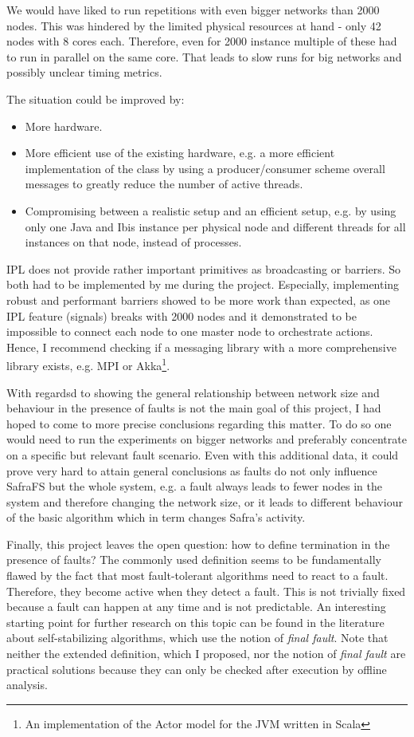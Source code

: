We would have liked to run repetitions with even bigger networks than 2000 nodes.
This was hindered by the limited physical resources at hand - only 42 nodes with 8 cores each.
Therefore, even for 2000 instance multiple of these had to run in parallel on the same core.
That leads to slow runs for big networks and possibly unclear timing metrics.

The situation could be improved by:
\begin{itemize}
    \item More hardware.
    \item More efficient use of the existing hardware, e.g. a more efficient implementation of the  class by using a producer/consumer scheme overall messages to greatly reduce the number of active threads.
    \item Compromising between a realistic setup and an efficient setup, e.g. by using only one Java and Ibis instance per physical node and different threads for all instances on that node, instead of processes.
\end{itemize}


IPL does not provide rather important primitives as broadcasting or barriers.
So both had to be implemented by me during the project.
Especially, implementing robust and performant barriers showed to be more work than expected, as one IPL feature (signals) breaks with 2000 nodes and it demonstrated to be impossible to connect each node to one master node to orchestrate actions.
Hence, I recommend checking if a messaging library with a more comprehensive library exists, e.g. MPI or Akka\footnote{An implementation of the Actor model for the JVM written in Scala}.

With regardsd to showing the general relationship between network size and behaviour in the presence of faults is not the main goal of this project, I had hoped to come to more precise conclusions regarding this matter.
To do so one would need to run the experiments on bigger networks and preferably concentrate on a specific but relevant fault scenario.
Even with this additional data, it could prove very hard to attain general conclusions as faults do not only influence SafraFS but the whole system, e.g. a fault always leads to fewer nodes in the system and therefore changing the network size, or it leads to different behaviour of the basic algorithm which in term changes Safra's activity.

Finally, this project leaves the open question: how to define termination in the presence of faults?
The commonly used definition seems to be fundamentally flawed by the fact that most fault-tolerant algorithms need to react to a fault.
Therefore, they become active when they detect a fault.
This is not trivially fixed because a fault can happen at any time and is not predictable.
An interesting starting point for further research on this topic can be found in the literature about self-stabilizing algorithms, which use the notion of \textit{final fault}.
Note that neither the extended definition, which I proposed, nor the notion of \textit{final fault} are practical solutions because they can only be checked after execution by offline analysis.